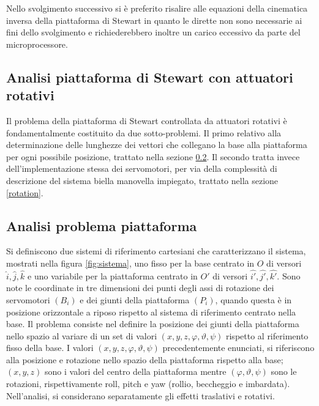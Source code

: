 \documentclass[11pt]{article}
\begin{document}
Nello svolgimento successivo si è preferito risalire alle equazioni della cinematica inversa della piattaforma di Stewart in quanto le dirette non sono necessarie ai fini dello svolgimento e richiederebbero inoltre un carico eccessivo da parte del microprocessore.



\subsection{Analisi piattaforma di Stewart con attuatori rotativi}\label{analisi}

Il problema della piattaforma di Stewart controllata da attuatori rotativi è fondamentalmente costituito da due sotto-problemi.
Il primo relativo alla determinazione delle lunghezze dei vettori che collegano la base alla piattaforma per ogni possibile posizione, trattato nella sezione \ref{platform}. Il secondo tratta invece dell'implementazione stessa dei servomotori, per via della complessità di descrizione del sistema biella manovella impiegato, trattato nella sezione \ref{rotation}. 

\subsection{Analisi problema piattaforma}\label{platform}

Si definiscono due sistemi di riferimento cartesiani che caratterizzano il sistema, mostrati nella figura \ref{fig:sistema}, uno fisso per la base centrato in $O$ di versori $\hat{i},\hat{j},\hat{k}$ e uno variabile per la piattaforma centrato in $O'$ di versori $\hat{i'},\hat{j'},\hat{k'}$. Sono note le coordinate in tre dimensioni dei punti degli assi di rotazione dei servomotori $({B_i})$ e dei giunti della piattaforma $(P_i)$, quando questa è in posizione orizzontale a riposo rispetto al sistema di riferimento centrato nella base. Il problema consiste nel definire la posizione dei giunti della piattaforma nello spazio al variare di un set di valori $(x,y,z,\varphi,\vartheta,\psi)$ rispetto al riferimento fisso della base. I valori $(x,y,z,\varphi,\vartheta,\psi)$ precedentemente enunciati, si riferiscono alla posizione e rotazione nello spazio della piattaforma rispetto alla base; $(x,y,z)$ sono i valori del centro della piattaforma mentre $(\varphi,\vartheta,\psi)$ sono le rotazioni, rispettivamente roll, pitch e yaw (rollio, beccheggio e imbardata). Nell'analisi, si considerano separatamente gli effetti traslativi e rotativi.
\end{document}
